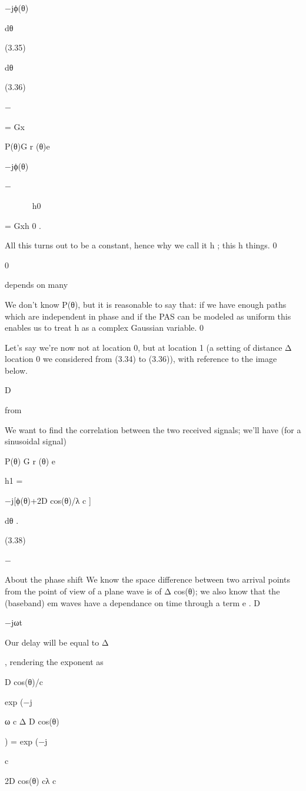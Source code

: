 {{{{−jϕ(θ)

dθ

(3.35)

dθ

(3.36)

−\pi
\pi

= \sqrt Gx\int

\sqrt P(θ)G r (θ)e

−jϕ(θ)

−\pi






h0

= \sqrt Gxh 0 .

All this turns out to be a constant, hence why we call it h ; this h things.
0

0

depends on many

We don't know P(θ), but it is reasonable to say that:
if we have enough paths which are independent in phase and if the PAS can be modeled as uniform this enables us to treat h as a complex Gaussian variable.
0

Let's say we're now not at location 0, but at location 1 (a setting of distance Δ location 0 we considered from (3.34) to (3.36)), with reference to the image below.

D

from

We want to find the correlation between the two received signals; we'll have (for a sinusoidal signal)
\pi

\sqrt P(θ) G r (θ) e

h1 = \int

−j[ϕ(θ)+2 D cos(θ)/λ c ]

dθ .

(3.38)

−\pi

​About the phase shift We know the space difference between two arrival points from the point of view of a plane wave is of Δ cos(θ); we also know that the (baseband) em waves have a dependance on time through a term e
.
D

−jωt

Our delay will be equal to Δ

, rendering the exponent as

D cos(θ)/c

exp (−j

ω c Δ D cos(θ)

) = exp (−j

c

2 D cos(θ)
cλ c

}}}}
